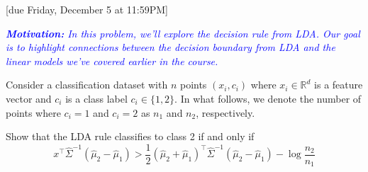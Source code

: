 \documentclass{article}
\newcommand{\R}{\mathbb{R}}
\begin{document}
[due Friday, December 5 at 11:59PM]

\begin{probset}
\begin{prob}
    \textit{\textcolor{blue}{\textbf{Motivation:} In this problem, we'll explore the decision rule from LDA. Our goal is to highlight connections between the decision boundary from LDA and the linear models we've covered earlier in the course.}}

    Consider a classification dataset with $n$ points $(x_i, c_i)$ where $x_i \in \R^d$ is a feature vector and $c_i$ is a class label $c_i \in \{1, 2\}$. In what follows, we denote the number of points where $c_i = 1$ and $c_i = 2$ as $n_1$ and $n_2$, respectively.

    \begin{subprobset}
        \begin{subprob}
            Show that the LDA rule classifies to class 2 if and only if
            \[
                x^\top \hat{\Sigma}^{-1} (\hat{\mu}_2 - \hat{\mu}_1) > \frac{1}{2} (\hat{\mu}_2 + \hat{\mu}_1)^\top \hat{\Sigma}^{-1} (\hat{\mu}_2 - \hat{\mu}_1) - \log \frac{n_2}{n_1}
            \]


\end{subprob}
\end{subprobset}
\end{prob}
\end{probset}
\end{document}
